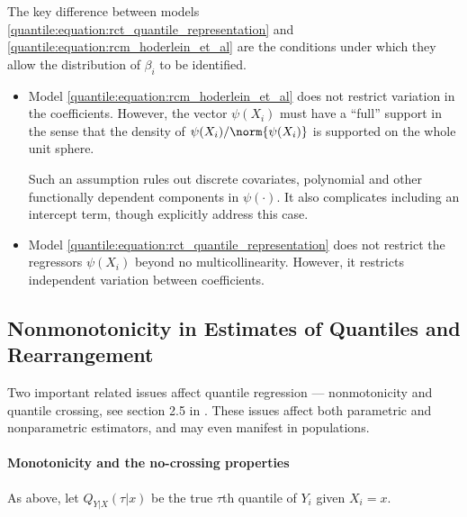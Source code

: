   The key difference between   models \eqref{quantile:equation:rct_quantile_representation} and \eqref{quantile:equation:rcm_hoderlein_et_al} are the conditions under which they allow the distribution of $\beta_i$ to be identified.
 \begin{itemize}
 	\item  Model \eqref{quantile:equation:rcm_hoderlein_et_al} does not restrict variation in the coefficients. However, the vector $\psi(X_i)$ must have a ``full'' support in the sense that the density of $\psi(X_i)/\norm{\psi(X_i)}$ is supported on the whole unit sphere.
 	
 	
 	  Such an assumption rules out discrete covariates, polynomial and other functionally dependent components in $\psi(\cdot)$. It also complicates including an intercept term, though \cite{Hoderlein2010} explicitly address this case.
 	
 	\item   Model \eqref{quantile:equation:rct_quantile_representation} does not restrict  the regressors $\psi(X_i)$ beyond no multicollinearity. However, it   restricts independent variation between coefficients. 
 	 \end{itemize}
 
 


 
	 \subsection{Nonmonotonicity in Estimates of Quantiles and Rearrangement}

  Two important related issues affect quantile regression --- nonmotonicity and quantile crossing, see section 2.5 in \cite{Koenker2005}. These issues affect both parametric and nonparametric estimators, and may even manifest in populations. 

\paragraph{Monotonicity and the no-crossing properties}

As above, let $Q_{Y|X}(\tau|x)$ be the true $\tau$th quantile of $Y_i$ given $X_i=x$.

